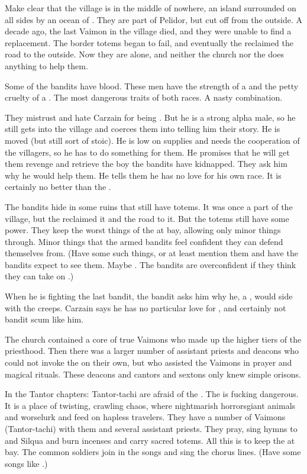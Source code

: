 Make clear that the village is in the middle of nowhere, an island surrounded on all sides by an ocean of \wylde.
They are part of Pelidor, but cut off from the outside.
A decade ago, the last Vaimon in the village died, and they were unable to find a replacement.
The border totems began to fail, and eventually the \wylde reclaimed the road to the outside.
Now they are alone, and neither the church nor the \rayuth does anything to help them.

Some of the bandits have \nephil blood.
These men have the strength of a \nephil and the petty cruelty of a \human.
The most dangerous traits of both races.
A nasty combination.

They mistrust and hate Carzain for being \human.
But he is a strong alpha male, so he still gets into the village and coerces them into telling him their story.
He is moved (but still sort of stoic).
He is low on supplies and needs the cooperation of the villagers, so he has to do something for them.
He promises that he will get them revenge and retrieve the boy the bandits have kidnapped.
They ask him why he would help them.
He tells them he has no love for his own race.
It is certainly no better than the \scathae.

The bandits hide in some ruins that still have \wylde totems.
It was once a part of the village, but the \wylde reclaimed it and the road to it.
But the totems still have some power.
They keep the worst things of the \wylde at bay, allowing only minor things through.
Minor things that the armed bandits feel confident they can defend themselves from.
(Have some such things, or at least mention them and have the bandits expect to see them. Maybe \nycans. 
The bandits are overconfident if they think they can take on \nycans.)

When he is fighting the last bandit, the bandit asks him why he, a \human, would side with the creeps.
Carzain says he has no particular love for \humans, and certainly not bandit scum like him.

The \Iquinian church contained a core of true Vaimons who made up the higher tiers of the priesthood.
Then there was a larger number of assistant priests and deacons who could not invoke the \sephiroth on their own, but who assisted the Vaimons in prayer and magical rituals.
These deacons and cantors and sextons only knew simple orisons.

In the Tantor chapters:
Tantor-tachi are afraid of the \wylde.
The \wylde is fucking dangerous.
It is a place of twisting, crawling chaos, where nightmarish horrors\dash{}giant animals and worse\dash{}lurk and feed on hapless travelers.
They have a number of Vaimons (Tantor-tachi) with them and several assistant priests.
They pray, sing hymns to \Iquin and Silqua and burn incenses and carry sacred totems.
All this is to keep the \wylde at bay.
The common soldiers join in the songs and sing the chorus lines.
(Have some songs like .)

